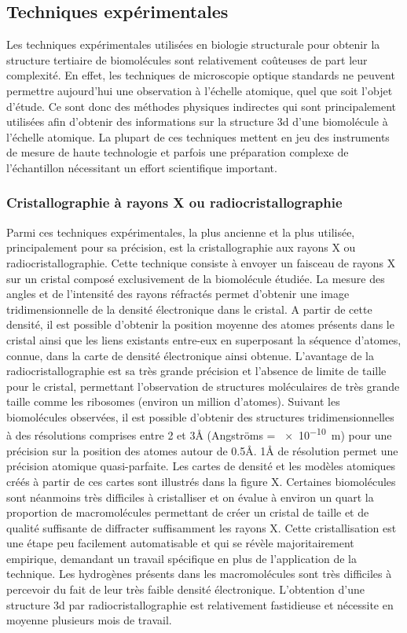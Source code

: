 \subsection{Techniques expérimentales}

Les techniques expérimentales utilisées en biologie structurale pour obtenir la structure tertiaire de biomolécules sont relativement coûteuses de part leur complexité. En effet, les techniques de microscopie optique standards ne peuvent permettre aujourd'hui une observation à l'échelle atomique, quel que soit l'objet d'étude. Ce sont donc des méthodes physiques indirectes qui sont principalement utilisées afin d'obtenir des informations sur la structure 3d d'une biomolécule à l'échelle atomique. La plupart de ces techniques mettent en jeu des instruments de mesure de haute technologie et parfois une préparation complexe de l'échantillon nécessitant un effort scientifique important.

\subsubsection{Cristallographie à rayons X ou radiocristallographie}

Parmi ces techniques expérimentales, la plus ancienne et la plus utilisée, principalement pour sa précision, est la cristallographie aux rayons X ou radiocristallographie. Cette technique consiste à envoyer un faisceau de rayons X sur un cristal composé exclusivement de la biomolécule étudiée. La mesure des angles et de l'intensité des rayons réfractés permet d'obtenir une image tridimensionnelle de la densité électronique dans le cristal. A partir de cette densité, il est possible d'obtenir la position moyenne des atomes présents dans le cristal ainsi que les liens existants entre-eux en superposant la séquence d'atomes, connue, dans la carte de densité électronique ainsi obtenue. 
L'avantage de la radiocristallographie est sa très grande précision et l'absence de limite de taille pour le cristal, permettant l'observation de structures moléculaires de très grande taille comme les ribosomes (environ un million d'atomes). Suivant les biomolécules observées, il est possible d'obtenir des structures tridimensionnelles à des résolutions comprises entre 2 et 3\r{A} (Angströms = \SI{e-10}{\metre}) pour une précision sur la position des atomes autour de 0.5\r{A}. 1\r{A} de résolution permet une précision atomique quasi-parfaite. Les cartes de densité et les modèles atomiques créés à partir de ces cartes sont illustrés dans la figure X. 
Certaines biomolécules sont néanmoins très difficiles à cristalliser et on évalue à environ un quart la proportion de macromolécules permettant de créer un cristal de taille et de qualité suffisante de diffracter suffisamment les rayons X. Cette cristallisation est une étape peu facilement automatisable et qui se révèle majoritairement empirique, demandant un travail spécifique en plus de l'application de la technique. Les hydrogènes présents dans les macromolécules sont très difficiles à percevoir du fait de leur très faible densité électronique. L'obtention d'une structure 3d par radiocristallographie est relativement fastidieuse et nécessite en moyenne plusieurs mois de travail.

